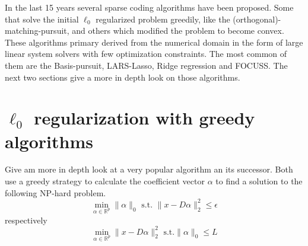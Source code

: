 In the last 15 years several sparse coding algorithms have been proposed. Some
that solve the initial $\ell_0$ regularized problem greedily, like
the (orthogonal)-matching-pursuit, and others which modified the problem to
become convex. These algorithms primary derived from the numerical domain in the
form of large linear system solvers with few optimization constraints. The most
common of them are the Basis-pursuit, LARS-Lasso, Ridge regression
and FOCUSS. The next two sections give a more in depth look on those
algorithms. 




\section{$\ell_0$ regularization with greedy algorithms}
Give am more in depth look at a very popular algorithm an its successor. Both
use a greedy strategy to calculate the coefficient vector $\alpha$ to find a
solution to the following NP-hard problem.
\begin{equation}
\min_{\alpha\in\mathbb{R}^{p}}   \lVert \alpha \rVert_{0}   \textrm{ s.t. }
\lVert x - D\alpha \rVert^{2}_{2} \leq \epsilon
\end{equation}
respectively
\begin{equation}
\min_{\alpha\in\mathbb{R}^{p}}  \lVert x - D\alpha \rVert^{2}_{2} \textrm{ s.t.
} \lVert \alpha \rVert_{0} \leq L
\end{equation}
\cite{Mallat1993}

